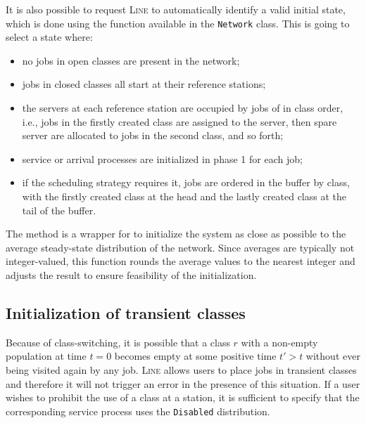 It is also possible to request \textsc{Line} to automatically identify a valid initial state, which is done using the  function available in the \texttt{Network} class. This is going to select a state where:
\begin{itemize}
\item no jobs in open classes are present in the network;
\item jobs in closed classes all start at their reference stations;
\item the servers at each reference station are occupied by jobs of in class order, i.e., jobs in the firstly created class are assigned to the server, then spare server are allocated to jobs in the second class, and so forth;
\item service or arrival processes are initialized in phase 1 for each job;
\item if the scheduling strategy requires it, jobs are ordered in the buffer by class, with the firstly created class at the head and the lastly created class at the tail of the buffer.
\end{itemize}

The  method is a wrapper for  to initialize the system as close as possible to the average steady-state distribution of the network. Since averages are typically not integer-valued, this function rounds the average values to the nearest integer and adjusts the result to ensure feasibility of the initialization.

\subsection{Initialization of transient classes}
Because of class-switching, it is possible that a class $r$ with a non-empty population at time $t=0$ becomes empty at some positive time $t'>t$ without ever being visited again by any job. \textsc{Line} allows users to place jobs in transient classes and therefore it will not trigger an error in the presence of this situation. If a user wishes to prohibit the use of a class at a station, it is sufficient to specify that the corresponding service process uses the \texttt{Disabled} distribution.

